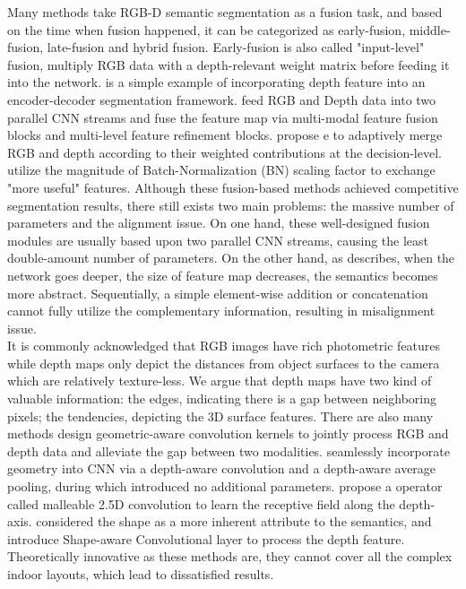 ﻿\documentclass[journal]{IEEEtran}
\begin{document}
    Many methods take RGB-D semantic segmentation as a fusion task, and based on the time when fusion happened, it can be categorized as early-fusion, middle-fusion, late-fusion and hybrid fusion\cite{zhang2021deep}. Early-fusion is also called "input-level" fusion, \cite{cao2021rgbxd} multiply RGB data with a depth-relevant weight matrix before feeding it into the network.  \cite{2016fusenet} is a simple example of incorporating depth feature into an encoder-decoder segmentation framework. \cite{park2017rdfnet} feed RGB and Depth data into two parallel CNN streams and fuse the feature map via multi-modal feature fusion blocks and multi-level feature refinement blocks. \cite{cheng2017locality} propose e to adaptively merge RGB and depth according to their weighted contributions at the decision-level. \cite{2020deep} utilize the magnitude of Batch-Normalization (BN) scaling factor to exchange "more useful" features. Although these fusion-based methods achieved competitive segmentation results, there still exists two main problems: the massive number of parameters and the alignment issue. On one hand, these well-designed fusion modules are usually based upon two parallel CNN streams, causing the least double-amount number of parameters. On the other hand, as \cite{2021global} describes, when the network goes deeper, the size of feature map decreases, the semantics becomes more abstract. Sequentially, a simple element-wise addition or concatenation cannot fully utilize the complementary information, resulting in misalignment issue.\\   
     It is commonly acknowledged that RGB images have rich photometric features while depth maps only depict the distances from object surfaces to the camera which are relatively texture-less. We argue that depth maps have two kind of valuable information: the edges, indicating there is a gap between neighboring pixels; the tendencies, depicting the 3D surface features. There are also many methods design geometric-aware convolution kernels to jointly process RGB and depth data and alleviate the gap between two modalities. \cite{2018depthaware} seamlessly incorporate geometry into CNN via a depth-aware convolution and a depth-aware average pooling, during which introduced no additional parameters. \cite{2020malleable} propose a operator called malleable 2.5D convolution to learn the receptive field along the depth-axis. \cite{2021shapeconv} considered the shape as a more inherent attribute to the semantics, and introduce Shape-aware Convolutional layer to process the depth feature. Theoretically innovative as these methods are, they cannot cover all the complex indoor layouts, which lead to dissatisfied results. \\   
\end{document}
